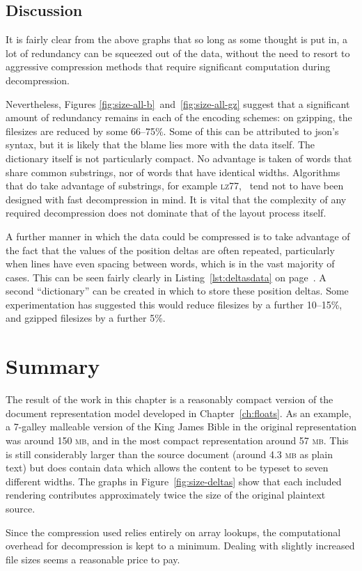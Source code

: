 \subsection{Discussion}

It is fairly clear from the above graphs that so long as some thought is put in, a lot of redundancy can be squeezed out of the data, without the need to resort to aggressive compression methods that require significant computation during decompression.

Nevertheless, Figures \ref{fig:size-all-b}~and~\ref{fig:size-all-gz} suggest that a significant amount of redundancy remains in each of the encoding schemes: on gzipping, the filesizes are reduced by some 66--75\%. Some of this can be attributed to \gls{json}'s syntax, but it is likely that the blame lies more with the data itself. The dictionary itself is not particularly compact. No advantage is taken of words that share common substrings, nor of words that have identical widths.
Algorithms that do take advantage of substrings, for example \textsc{lz77},~\cite{Ziv1977} tend not to have been designed with fast decompression in mind. It is vital that the complexity of any required decompression does not dominate that of the layout process itself.

A further manner in which the data could be compressed is to take advantage of the fact that the values of the position deltas are often repeated, particularly when lines have even spacing between words, which is in the vast majority of cases. This can be seen fairly clearly in Listing~\ref{lst:deltasdata} on page~\pageref{lst:deltasdata}. A second ``dictionary'' can be created in which to store these position deltas. Some experimentation has suggested this would reduce filesizes by a further 10--15\%, and gzipped filesizes by a further 5\%.

\section{Summary}

The result of the work in this chapter is a reasonably compact version of the document representation model developed in Chapter~\ref{ch:floats}. As an example, a 7-galley malleable version of the King James Bible in the original representation was around 150 \textsc{mb}, and in the most compact representation around 57 \textsc{mb}. This is still considerably larger than the source document (around 4.3 \textsc{mb} as plain text) but does contain data which allows the content to be typeset to seven different widths. The graphs in Figure~\ref{fig:size-deltas} show that each included rendering contributes approximately twice the size of the original plaintext source.

Since the compression used relies entirely on array lookups, the computational overhead for decompression is kept to a minimum. Dealing with slightly increased file sizes seems a reasonable price to pay.
